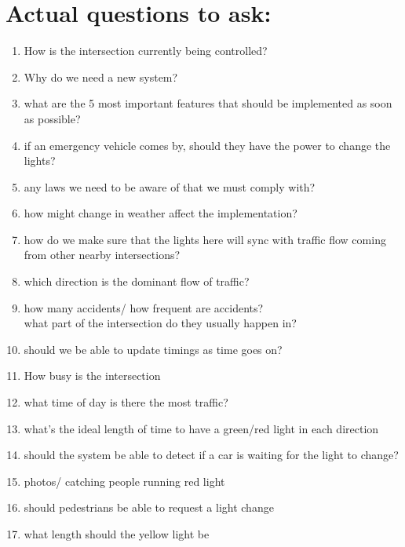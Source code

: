 \documentclass[letterpaper]{article}
\begin{document}
\section{Actual questions to ask:}
\begin{enumerate}
 \item How is the intersection currently being controlled?
 \item Why do we need a new system?
 \item what are the 5 most important features that should be implemented as soon as possible?
 \item if an emergency vehicle comes by, should they have the power to change the lights?
 \item any laws we need to be aware of that we must comply with?
 \item how might change in weather affect the implementation?
 \item how do we make sure that the lights here will sync with traffic flow
       coming from other nearby intersections?
 \item which direction is the dominant flow of traffic?
 \item how many accidents/ how frequent are accidents?\\
       what part of the intersection do they usually happen in?
 \item should we be able to update timings as time goes on?
       
 \item How busy is the intersection
 \item what time of day is there the most traffic?
       
 \item what's the ideal length of time to have a green/red light in each direction
 \item should the system be able to detect if a car is waiting for the light to change?
 \item photos/ catching people running red light
 \item should pedestrians be able to request a light change
 \item what length should the yellow light be
       

\end{enumerate}
\end{document}
